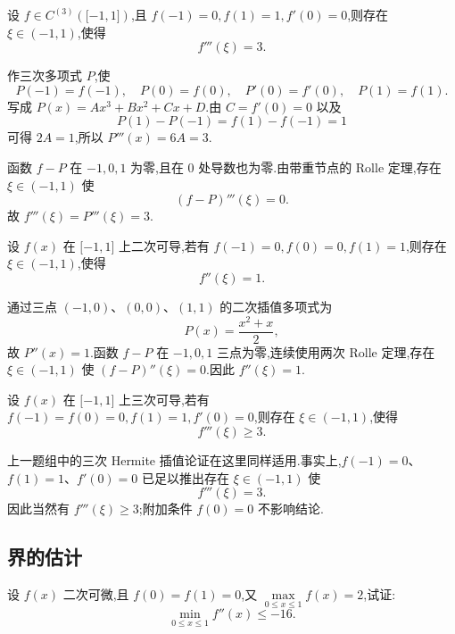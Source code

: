 \begin{example}
    设 $f\in C^{(3)}(\lbrack -1,1\rbrack)$,且 $f(-1)=0,f(1)=1,f'(0)=0$,则存在 $\xi\in(-1,1)$,使得
    \[
        f'''(\xi)=3.
    \]
\end{example}
\exampleblank

\begin{solution}
    作三次多项式 $P$,使
    \[
        P(-1)=f(-1),
        \quad P(0)=f(0),
        \quad P'(0)=f'(0),
        \quad P(1)=f(1).
    \]
    写成 $P(x)=Ax^3+Bx^2+Cx+D$.由 $C=f'(0)=0$ 以及
    \[
        P(1)-P(-1)=f(1)-f(-1)=1
    \]
    可得 $2A=1$,所以 $P'''(x)=6A=3$.

    函数 $f-P$ 在 $-1,0,1$ 为零,且在 $0$ 处导数也为零.由带重节点的 Rolle 定理,存在 $\xi\in(-1,1)$ 使
    \[
        (f-P)'''(\xi)=0.
    \]
    故 $f'''(\xi)=P'''(\xi)=3$.
\end{solution}

\begin{example}
    设 $f(x)$ 在 $\lbrack -1,1\rbrack$ 上二次可导,若有 $f(-1)=0,f(0)=0,f(1)=1$,则存在 $\xi\in(-1,1)$,使得
    \[
        f''(\xi)=1.
    \]
\end{example}
\exampleblank

\begin{solution}
    通过三点 $(-1,0)$、$(0,0)$、$(1,1)$ 的二次插值多项式为
    \[
        P(x)=\dfrac{x^2+x}{2},
    \]
    故 $P''(x)=1$.函数 $f-P$ 在 $-1,0,1$ 三点为零,连续使用两次 Rolle 定理,存在 $\xi\in(-1,1)$ 使 $(f-P)''(\xi)=0$.因此 $f''(\xi)=1$.
\end{solution}

\begin{example}
    设 $f(x)$ 在 $\lbrack -1,1\rbrack$ 上三次可导,若有 $f(-1)=f(0)=0,f(1)=1,f'(0)=0$,则存在 $\xi\in(-1,1)$,使得
    \[
        f'''(\xi)\geq 3.
    \]
\end{example}
\exampleblank

\begin{solution}
    上一题组中的三次 Hermite 插值论证在这里同样适用.事实上,$f(-1)=0$、$f(1)=1$、$f'(0)=0$ 已足以推出存在 $\xi\in(-1,1)$ 使
    \[
        f'''(\xi)=3.
    \]
    因此当然有 $f'''(\xi)\geq3$;附加条件 $f(0)=0$ 不影响结论.
\end{solution}



\subsection{界的估计}

\begin{example}
    设 $f(x)$ 二次可微,且 $f(0)=f(1)=0$,又
    $\displaystyle\max\limits_{0\leq x\leq1}f(x)=2$,试证:
    \[
        \min\limits_{0\leq x\leq1}f''(x)\leq-16.
    \]
\end{example}
\exampleblank

